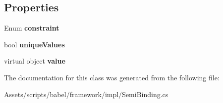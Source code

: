 \subsection*{Properties}
\begin{DoxyCompactItemize}
\item 
\hypertarget{classbabel_1_1framework_1_1impl_1_1_semi_binding_acaed578efdfdb4439cd26bf49881a4bd}{Enum {\bfseries constraint}}\label{classbabel_1_1framework_1_1impl_1_1_semi_binding_acaed578efdfdb4439cd26bf49881a4bd}

\item 
\hypertarget{classbabel_1_1framework_1_1impl_1_1_semi_binding_a1d7830b23eb70c731dd53dd740d541df}{bool {\bfseries unique\-Values}}\label{classbabel_1_1framework_1_1impl_1_1_semi_binding_a1d7830b23eb70c731dd53dd740d541df}

\item 
\hypertarget{classbabel_1_1framework_1_1impl_1_1_semi_binding_a21ba6f053e43786ee0f0142a5fd352e4}{virtual object {\bfseries value}}\label{classbabel_1_1framework_1_1impl_1_1_semi_binding_a21ba6f053e43786ee0f0142a5fd352e4}

\end{DoxyCompactItemize}


The documentation for this class was generated from the following file\-:\begin{DoxyCompactItemize}
\item 
Assets/scripts/babel/framework/impl/Semi\-Binding.\-cs\end{DoxyCompactItemize}
